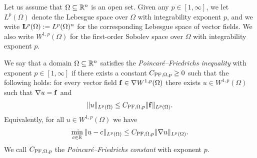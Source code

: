 \documentclass[a4paper]{amsart}
\begin{document}
Let us assume that $\Omega \subseteq {\mathbb R}^{n}$ is an open set. 
Given any $p \in [1,\infty]$, we let $L^p(\Omega)$ denote the Lebesgue space over $\Omega$ with integrability exponent $p$, and we write ${\mathbf L}^p(\Omega) := L^p(\Omega)^n$ for the corresponding Lebesgue space of vector fields. 
We also write $W^{1,p}(\Omega)$ for the first-order Sobolev space over $\Omega$ with integrability exponent $p$. 

We say that a domain $\Omega \subseteq {\mathbb R}^{n}$ satisfies the \emph{Poincar\'e--Friedrichs inequality} with exponent $p \in [1,\infty]$
if there exists a constant $C_{{\rm PF},\Omega,p} \geq 0$ such that the following holds:
for every vector field ${\mathbf f} \in \nabla W^{1,p}(\Omega)$ there exists $u \in W^{1,p}(\Omega)$
such that $\nabla u = {\mathbf f}$ and 
\begin{align}\label{math:inequalitypf:gradient}
    \| u \|_{L^{p}(\Omega)}
    \leq 
    C_{{\rm PF},\Omega,p} 
    \| {\mathbf f} \|_{L^{p}(\Omega)}
    .
\end{align}
Equivalently, for all $u \in W^{1,p}(\Omega)$ we have 
\begin{align}
    \min_{ c \in {\mathbb R} } \| u - c \|_{L^{p}(\Omega)}
    \leq 
    C_{{\rm PF},\Omega,p} 
    \| \nabla u \|_{L^{p}(\Omega)}
    .
\end{align}
We call $C_{{\rm PF},\Omega,p}$ the \emph{Poincar\'e--Friedrichs constant} with exponent $p$. 
\end{document}
